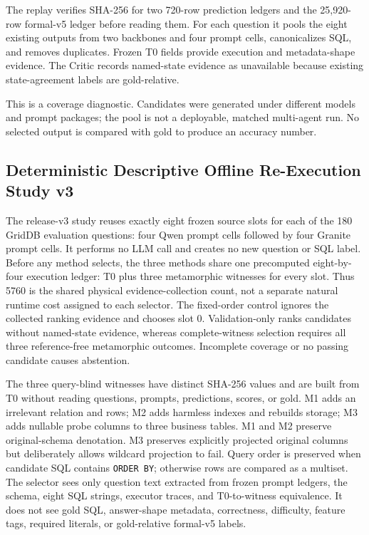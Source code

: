 \documentclass[applsci,article,submit,moreauthors]{Definitions/mdpi}
\begin{document}
The replay verifies SHA-256 for two 720-row prediction ledgers and the 25,920-row formal-v5 ledger before reading them. For each question it pools the eight existing outputs from two backbones and four prompt cells, canonicalizes SQL, and removes duplicates. Frozen T0 fields provide execution and metadata-shape evidence. The Critic records named-state evidence as unavailable because existing state-agreement labels are gold-relative.

This is a coverage diagnostic. Candidates were generated under different models and prompt packages; the pool is not a deployable, matched multi-agent run. No selected output is compared with gold to produce an accuracy number.

\subsection{Deterministic Descriptive Offline Re-Execution Study v3}

The release-v3 study reuses exactly eight frozen source slots for each of the 180 GridDB evaluation questions: four Qwen prompt cells followed by four Granite prompt cells. It performs no LLM call and creates no new question or SQL label. Before any method selects, the three methods share one precomputed eight-by-four execution ledger: T0 plus three metamorphic witnesses for every slot. Thus 5760 is the shared physical evidence-collection count, not a separate natural runtime cost assigned to each selector. The fixed-order control ignores the collected ranking evidence and chooses slot 0. Validation-only ranks candidates without named-state evidence, whereas complete-witness selection requires all three reference-free metamorphic outcomes. Incomplete coverage or no passing candidate causes abstention.

The three query-blind witnesses have distinct SHA-256 values and are built from T0 without reading questions, prompts, predictions, scores, or gold. M1 adds an irrelevant relation and rows; M2 adds harmless indexes and rebuilds storage; M3 adds nullable probe columns to three business tables. M1 and M2 preserve original-schema denotation. M3 preserves explicitly projected original columns but deliberately allows wildcard projection to fail. Query order is preserved when candidate SQL contains \texttt{ORDER BY}; otherwise rows are compared as a multiset. The selector sees only question text extracted from frozen prompt ledgers, the schema, eight SQL strings, executor traces, and T0-to-witness equivalence. It does not see gold SQL, answer-shape metadata, correctness, difficulty, feature tags, required literals, or gold-relative formal-v5 labels.
\end{document}
